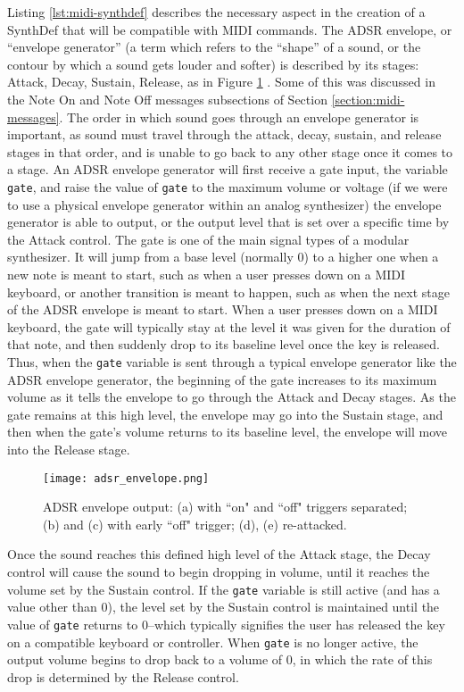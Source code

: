 Listing \ref{lst:midi-synthdef} describes the necessary aspect in the creation of a SynthDef that will  be compatible with MIDI commands. The ADSR envelope, or ``envelope generator'' (a term which refers to the ``shape'' of a sound, or the contour by which a sound gets louder and softer) is described by its stages: Attack, Decay, Sustain, Release, as in Figure \ref{fig:adsr-envelope} \cite{Puckette_2007}. Some of this was discussed in the Note On and Note Off messages subsections of Section \ref{section:midi-messages}. The order in which sound goes through an envelope generator is important, as sound must travel through the attack, decay, sustain, and release stages in that order, and is unable to go back to any other stage once it comes to a stage. An ADSR envelope generator will first receive a gate input, the variable \texttt{gate}, and raise the value of \texttt{gate} to the maximum volume or voltage (if we were to use a physical envelope generator within an analog synthesizer) the envelope generator is able to output, or the output level that is set over a specific time by the Attack control. The gate is one of the main signal types of a modular synthesizer. It will jump from a base level (normally 0) to a higher one when a new note is meant to start, such as when a user presses down on a MIDI keyboard, or another transition is meant to happen, such as when the next stage of the ADSR envelope is meant to start. When a user presses down on a MIDI keyboard, the gate will typically stay at the level it was given for the duration of that note, and then suddenly drop to its baseline level once the key is released. Thus, when the \texttt{gate} variable is sent through a typical envelope generator like the ADSR envelope generator, the beginning of the gate increases to its maximum volume as it tells the envelope to go through the Attack and Decay stages. As the gate remains at this high level, the envelope may go into the Sustain stage, and then when the gate's volume returns to its baseline level, the envelope will move into the Release stage. 

\begin{figure}
  \centering
  \texttt{[image: adsr\_envelope.png]}
  \caption{ADSR envelope output: (a) with ``on" and ``off" triggers separated; (b) and (c) with early ``off" trigger; (d), (e) re-attacked.} \cite{Puckette_2007}
  \label{fig:adsr-envelope}
\end{figure}

Once the sound reaches this defined high level of the Attack stage, the Decay control will cause the sound to begin dropping in volume, until it reaches the volume set by the Sustain control. If the \texttt{gate} variable is still active (and has a value other than 0), the level set by the Sustain control is maintained until the value of \texttt{gate} returns to 0--which typically signifies the user has released the key on a compatible keyboard or controller. When \texttt{gate} is no longer active, the output volume begins to drop back to a volume of 0, in which the rate of this drop is determined by the Release control. 

